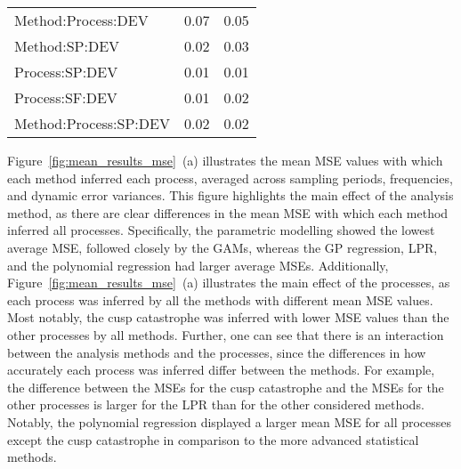 \documentclass[man, floatsintext]{apa7}
\begin{document}
\begin{table}[tbp]
\begin{center}
\begin{threeparttable}
\begin{tabular}{lll}
        \\
        Method:Process:DEV    & 0.07                                     & 0.05
        \\
        Method:SP:DEV         & 0.02                                     & 0.03
        \\
        Process:SP:DEV        & 0.01                                     & 0.01
        \\
        Process:SF:DEV        & 0.01                                     & 0.02
        \\
        Method:Process:SP:DEV & 0.02                                     & 0.02
        \\
        \bottomrule
      \end{tabular}
    \end{threeparttable}
  \end{center}

\end{table}

Figure~\ref{fig:mean_results_mse}~(a) illustrates the mean MSE values with
which each method inferred each process, averaged across sampling periods,
frequencies, and dynamic error variances. This figure highlights the main
effect of the analysis method, as there are clear differences in the mean MSE
with which each method inferred all processes. Specifically, the parametric
modelling showed the lowest average MSE, followed closely by the GAMs, whereas
the GP regression, LPR, and the polynomial regression had larger average MSEs.
Additionally, Figure~\ref{fig:mean_results_mse}~(a) illustrates the main effect
of the processes, as each process was inferred by all the methods with
different mean MSE values. Most notably, the cusp catastrophe was inferred with
lower MSE values than the other processes by all methods. Further, one can see
that there is an interaction between the analysis methods and the processes,
since the differences in how accurately each process was inferred differ
between the methods. For example, the difference between the MSEs for the cusp
catastrophe and the MSEs for the other processes is larger for the LPR than for
the other considered methods. Notably, the polynomial regression displayed a
larger mean MSE for all processes except the cusp catastrophe in comparison to
the more advanced statistical methods.
\end{document}

